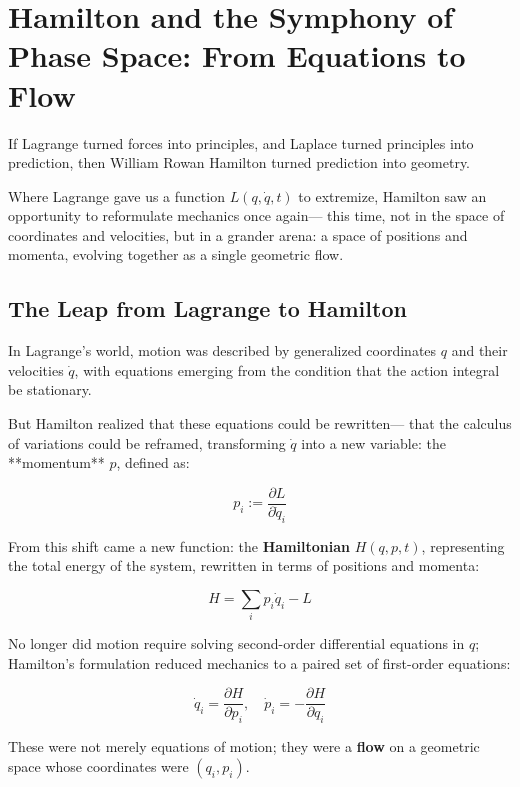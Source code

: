 \section{Hamilton and the Symphony of Phase Space: From Equations to Flow}

If Lagrange turned forces into principles,  
and Laplace turned principles into prediction,  
then William Rowan Hamilton turned prediction into geometry.

Where Lagrange gave us a function \( L(q, \dot{q}, t) \) to extremize,  
Hamilton saw an opportunity to reformulate mechanics once again—  
this time, not in the space of coordinates and velocities, but in a grander arena:  
a space of positions and momenta, evolving together as a single geometric flow.

\bigskip

\subsection*{The Leap from Lagrange to Hamilton}

In Lagrange’s world, motion was described by generalized coordinates \( q \) and their velocities \( \dot{q} \),  
with equations emerging from the condition that the action integral be stationary.

But Hamilton realized that these equations could be rewritten—  
that the calculus of variations could be reframed,  
transforming \( \dot{q} \) into a new variable: the **momentum** \( p \), defined as:

\[
p_i := \frac{\partial L}{\partial \dot{q}_i}
\]

From this shift came a new function: the \textbf{Hamiltonian} \( H(q, p, t) \),  
representing the total energy of the system, rewritten in terms of positions and momenta:

\[
H = \sum_i p_i \dot{q}_i - L
\]

\bigskip

No longer did motion require solving second-order differential equations in \( q \);  
Hamilton’s formulation reduced mechanics to a paired set of first-order equations:

\[
\dot{q}_i = \frac{\partial H}{\partial p_i}, \quad
\dot{p}_i = -\frac{\partial H}{\partial q_i}
\]

These were not merely equations of motion;  
they were a \textbf{flow} on a geometric space whose coordinates were \( (q_i, p_i) \).

\bigskip

